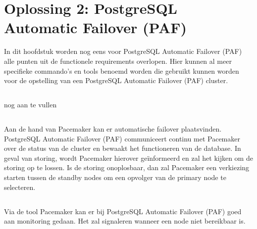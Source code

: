 
\chapter{Oplossing 2: PostgreSQL Automatic Failover (PAF)}
\label{ch:Oplossing 2: PostgreSQL Automatic Failover}



In dit hoofdstuk worden nog eens voor PostgreSQL Automatic Failover (PAF) alle punten uit de functionele requirements overlopen. Hier kunnen al meer specifieke commando's en tools benoemd worden die gebruikt kunnen worden voor de opstelling van een PostgreSQL Automatic Failover (PAF) cluster.


\section{}
\label{sec:Redundantie/Replicatie}

nog aan te vullen

\section{}
\label{sec:Failover}

Aan de hand van Pacemaker kan er automatische failover plaatsvinden. PostgreSQL Automatic Failover (PAF) communiceert continu met Pacemaker over de status van de cluster en bewaakt het functioneren van de database. In geval van storing, wordt Pacemaker hierover geïnformeerd en zal het kijken om de storing op te lossen. Is de storing onoplosbaar, dan zal Pacemaker een verkiezing starten tussen de standby nodes om een opvolger van de primary node te selecteren.

\section{}
\label{sec:Monitoring}

Via de tool Pacemaker kan er bij PostgreSQL Automatic Failover (PAF) goed aan monitoring gedaan. Het zal signaleren wanneer een node niet bereikbaar is.